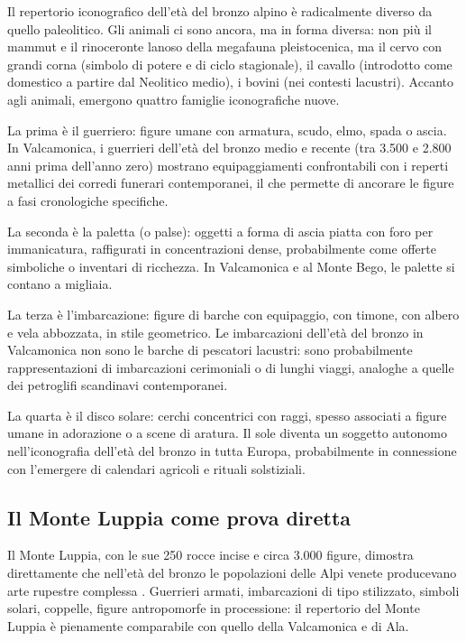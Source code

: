 Il repertorio iconografico dell'età del bronzo alpino è radicalmente diverso da quello paleolitico. Gli animali ci sono ancora, ma in forma diversa: non più il mammut e il rinoceronte lanoso della megafauna pleistocenica, ma il cervo con grandi corna (simbolo di potere e di ciclo stagionale), il cavallo (introdotto come domestico a partire dal Neolitico medio), i bovini (nei contesti lacustri). Accanto agli animali, emergono quattro famiglie iconografiche nuove.

La prima è il guerriero: figure umane con armatura, scudo, elmo, spada o ascia. In Valcamonica, i guerrieri dell'età del bronzo medio e recente (tra 3.500 e 2.800 anni prima dell'anno zero) mostrano equipaggiamenti confrontabili con i reperti metallici dei corredi funerari contemporanei, il che permette di ancorare le figure a fasi cronologiche specifiche.

La seconda è la paletta (o palse): oggetti a forma di ascia piatta con foro per immanicatura, raffigurati in concentrazioni dense, probabilmente come offerte simboliche o inventari di ricchezza. In Valcamonica e al Monte Bego, le palette si contano a migliaia.

La terza è l'imbarcazione: figure di barche con equipaggio, con timone, con albero e vela abbozzata, in stile geometrico. Le imbarcazioni dell'età del bronzo in Valcamonica non sono le barche di pescatori lacustri: sono probabilmente rappresentazioni di imbarcazioni cerimoniali o di lunghi viaggi, analoghe a quelle dei petroglifi scandinavi contemporanei.

La quarta è il disco solare: cerchi concentrici con raggi, spesso associati a figure umane in adorazione o a scene di aratura. Il sole diventa un soggetto autonomo nell'iconografia dell'età del bronzo in tutta Europa, probabilmente in connessione con l'emergere di calendari agricoli e rituali solstiziali.

\subsection{Il Monte Luppia come prova diretta}

Il Monte Luppia, con le sue 250 rocce incise e circa 3.000 figure, dimostra direttamente che nell'età del bronzo le popolazioni delle Alpi venete producevano arte rupestre complessa \citep{gaggia1982, gaggia2002}. Guerrieri armati, imbarcazioni di tipo stilizzato, simboli solari, coppelle, figure antropomorfe in processione: il repertorio del Monte Luppia è pienamente comparabile con quello della Valcamonica e di Ala.

